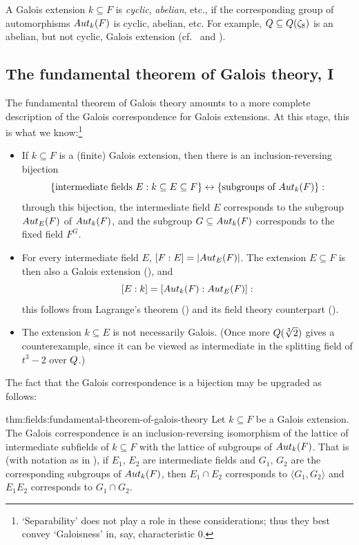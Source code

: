 A Galois extension $k \subseteq F$ is \emph{cyclic}, \emph{abelian},
etc., if the corresponding group of automorphisms $Aut_k(F)$ is
cyclic, abelian, etc. For example, $Q \subseteq Q(\zeta_8)$ is an
abelian, but not cyclic, Galois extension (cf.\
 and ).

\subsection{The fundamental theorem of Galois theory, I}
\label{subsec:fields:the-fundamental-theorem-of-galois-theory-i}
The fundamental theorem of Galois theory amounts to a more complete
description of the Galois correspondence for Galois extensions. At
this stage, this is what we know:\footnote{`Separability' does not
  play a role in these considerations; thus they best convey
  `Galoisness' in, say, characteristic $0$.}
\begin{itemize}
\item If $k \subseteq F$ is a (finite) Galois extension, then there is
  an inclusion-reversing bijection
  \[
    \{\text{intermediate fields } E : k \subseteq E \subseteq F\}
    \leftrightarrow \{\text{subgroups of } Aut_k(F)\}:
  \]
  through this bijection, the intermediate field $E$ corresponds to
  the subgroup $Aut_E(F)$ of $Aut_k(F)$, and the subgroup
  $G \subseteq Aut_k(F)$ corresponds to the fixed field $F^G$.
\item For every intermediate field $E$, $[F : E] = |Aut_E(F)|$. The
  extension $E \subseteq F$ is then also a Galois extension
  (), and
  \[ [E : k] = [Aut_k(F) : Aut_E(F)]:
  \]
  this follows from Lagrange's theorem ()
  and its field theory counterpart ().
\item The extension $k \subseteq E$ is not necessarily Galois. (Once
  more $Q(\sqrt[3]{2})$ gives a counterexample, since it can be
  viewed as intermediate in the splitting field of $t^3 - 2$ over
  $Q$.)
\end{itemize}
The fact that the Galois correspondence is a bijection may be upgraded
as follows:
\begin{thm}{}{thm:fields:fundamental-theorem-of-galois-theory}
  Let $k \subseteq F$ be a Galois extension. The Galois correspondence
  is an inclusion-reversing isomorphism of the lattice of intermediate
  subfields of $k \subseteq F$ with the lattice of subgroups of
  $Aut_k(F)$. That is (with notation as in ), if
  $E_1$, $E_2$ are intermediate fields and $G_1$, $G_2$ are the
  corresponding subgroups of $Aut_k(F)$, then $E_1 \cap E_2$
  corresponds to $\langle G_1, G_2 \rangle$ and $E_1 E_2$ corresponds
  to $G_1 \cap G_2$.
\end{thm}

